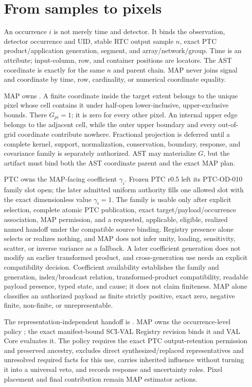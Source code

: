 \documentclass[10pt]{article}
\begin{document}
\clearpage
\section{From samples to pixels}\label{sec:samples}
An occurrence \(i\) is not merely time and detector. It binds the observation,
detector occurrence and UID, stable RTC output sample \(n\), exact PTC
product/application generation, segment, and array/network/group. Time is an
attribute; input-column, row, and container positions are locators. The AST
coordinate is exactly \SCIMapASTRTCGridProfile{} for the
same \(n\) and parent chain. MAP never joins signal and coordinate by time,
row, cardinality, or numerical coordinate equality.

MAP owns \SCIMapOneHotProfile. A finite coordinate inside
the target extent belongs to the unique pixel whose cell contains it under
half-open lower-inclusive, upper-exclusive bounds. There \(G_{pi}=1\); it is
zero for every other pixel. An internal upper edge belongs to the adjacent
cell, while the outer upper boundary and every out-of-grid coordinate
contribute nowhere. Fractional projection is deferred until a complete
kernel, support, normalization, conservation, boundary, response, and
covariance family is separately authorized. AST may materialize \(G\), but the
artifact must bind both the AST coordinate parent and the exact MAP plan.

PTC owns the MAP-facing coefficient \(\gamma_i\). Frozen PTC r0.5 left its
PTC-OD-010 family slot open; the later admitted uniform authority fills one
allowed slot with the exact dimensionless value \(\gamma_i=1\). The family is
usable only after explicit selection, complete atomic PTC publication, exact
target/payload/occurrence association, MAP permission, and a requested,
applicable, eligible, realized named handoff under the compatible source
binding. Registry presence alone selects or realizes nothing, and MAP does not
infer unity, loading, sensitivity, scatter, or inverse variance as a fallback.
A later coefficient generation does not modify an earlier transformed
product, and cross-generation use needs an explicit compatibility decision.
Coefficient availability establishes the family and generation,
index/broadcast relation, transformed-product compatibility, readable payload
presence, typed state, and cause; it does not claim finiteness. MAP alone
classifies an authorized payload as finite strictly positive, exact zero,
negative finite, non-finite, or unrepresentable.

The representation-independent handoff is
\SCIMapPTCMapBoundaryId. MAP owns the occurrence-level policy
\SCIMapUpstreamProfile; the exact manifest-bound SCI-VAL Registry revision binds it
and VAL Core evaluates it. The policy requires the exact PTC output-retention
permission and preserved ancestry, excludes direct synthesized/replaced
representatives and unresolved required facts for this use, carries inherited
influence without turning it into a universal veto, and records response and
uncertainty roles. Pixel placement and final contribution remain MAP
estimator actions.
\end{document}
